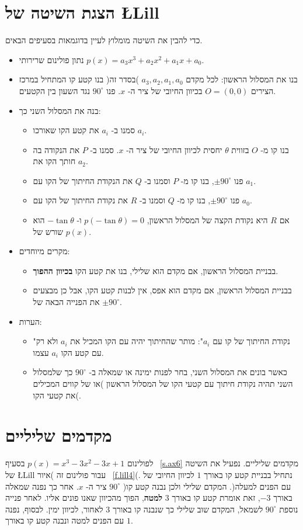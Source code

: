 \section{הצגת השיטה של
\L{Lill}}\label{s.method}

כדי להבין את השיטה מומלוץ לעיין בדוגמאות בסעיפים הבאים.
\begin{itemize}
\item 
נתון פולינום שרירותי
$p(x)=a_3x^3+a_2x^2+a_1x+a_0$.
\item 
בנו את המסלול הראשון: לכל מקדם
$a_3,a_2,a_1,a_0$
)בסדר זה( בנו קטע קו המתחיל במרכז הצירים
$O=(0,0)$
בכיוון החיובי של ציר ה-%
$x$.
פנו
$90^\circ$
נגד השעון בין הקטעים.
\item 
בנה את המסלול השני כך:
\begin{itemize}
\item
סמנו ב-%
$a_i$
את קטע הקו שאורכו
$a_i$.
\item
בנו קו מ-%
$O$
בזווית 
$\theta$ 
יחסית לכיוון החיובי של ציר ה-%
$x$.
סמנו ב-%
$P$
את הנקודה בה חותך הקו את 
$a_2$.
\item
פנו
$\pm 90^\circ$,
בנו קו מ-%
$P$
וסמנו ב-%
$Q$
את הנקודת החיתוך של הקו עם
$a_1$.
\item
פנו
$\pm 90^\circ$,
בנו קו מ-%
$Q$
וסמנו ב-%
$R$
את נקודת החיתוך של הקו עם
$a_0$.
\item
אם 
$R$
היא נקודת הקצה של המסלול הראשון, 
$p(-\tan\theta)=0$
ו-%
$-\tan\theta$
הוא שורש של 
$p(x)$.
\end{itemize}
\item
מקרים מיוחדים:
\begin{itemize}
\item 
בבניית המסלול הראשון, אם מקדם הוא שלילי, בנו את קטע הקו
\textbf{בכיוון ההפוך}.
\item
בבניית המסלול הראשון, אם מקדם הוא אפס, אין לבנות קטע הקו, אבל כן מבצעים את הפנייה הבאה של
$\pm90^\circ$.
\end{itemize}
\item הערות:
\begin{itemize}
\item 
"נקודת החיתוך של קו עם
$a_i$":
מותר שהחיתוך יהיה עם הקו המכיל את
$a_i$
ולא רק עם קטע הקו 
$a_i$
עצמו.
\item
כאשר בונים את המסלול השני, בחר לפנות ימינה או שמאלה ב-%
$90^\circ$
כך שלמסלול השני תהיה נקודת חיתוך עם קטעי הקו של המסלול הראשון )או של קווים המכילים את קטעי הקו(.
\end{itemize}
\end{itemize}

\section{מקדמים שליליים}\label{s.negative}
לפולינום 
$p(x)=x^3-3x^2-3x+1$
בסעיף%
~\ref{s.ax6}
מקדמים שליליים. נפעיל את השיטה של 
\L{Lill}
עבור פולינום זה )איור~%
\ref{f.lill4}(.
נתחיל בבניית קטע קו באורך
$1$
לכיוון החיובי של ציר ה-%
$x$. 
אחר כך נפנה שמאלה
$90^\circ$
)עם הפנים למעלה(. המקדם שלילי ולכן נבנה קטע קו באורך 
$-3$,
זאת אומרת קטע קו באורך
$3$
\textbf{למטה},
הפוך מהכיוון שאנו פונים אליו. לאחר פנייה נוספת
$90^\circ$
לשמאל, המקדם שוב שלילי כך שנבנה קו באורך
$3$
לאחור, לכיוון ימין. לבסוף, נפנה עם הפנים למטה ונבנה קטע קו באורך
$1$.

